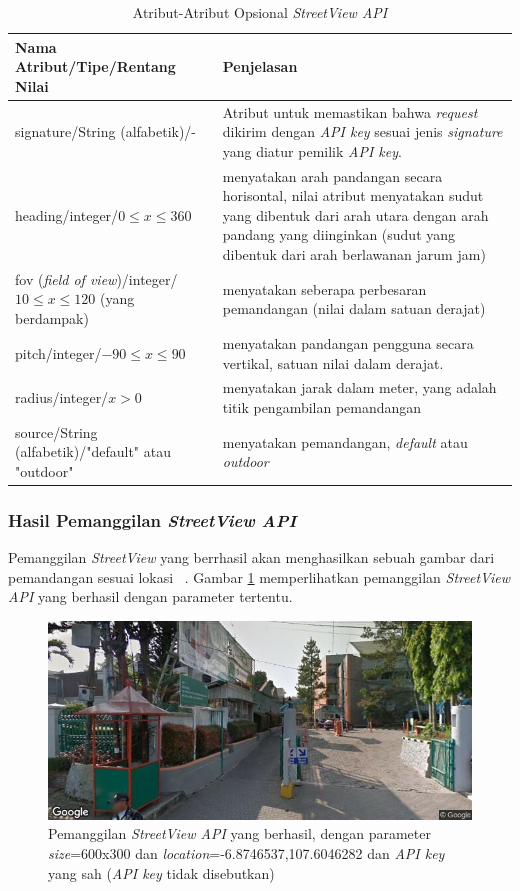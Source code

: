\begin{table}[ht!]
	\centering
	\caption{Atribut-Atribut Opsional \textit{StreetView API}}
	\label{tab:atribut-opsional-streetview-api}
\begin{tabular}{|p{7cm}|p{7cm}|}
\hline
Nama Atribut/Tipe/Rentang Nilai & Penjelasan \\ \hline \hline
signature/String (alfabetik)/- &  Atribut untuk memastikan bahwa \textit{request} dikirim dengan {\it API key} sesuai jenis \textit{signature} yang diatur pemilik {\it API key}.  \\ \hline
heading/integer/$ 0 \leq x \leq 360 $ & menyatakan arah pandangan secara horisontal, nilai atribut menyatakan sudut yang dibentuk dari arah utara dengan arah pandang yang diinginkan (sudut yang dibentuk dari arah berlawanan jarum jam) \\ \hline
fov (\textit{field of view})/integer/$ 10 \leq x \leq 120 $ (yang berdampak) & menyatakan seberapa perbesaran pemandangan (nilai dalam satuan derajat) \\ \hline
pitch/integer/$ -90 \leq  x \leq 90$ & menyatakan pandangan pengguna secara vertikal, satuan nilai dalam derajat.\\ \hline
radius/integer/$ x > 0 $ & menyatakan jarak dalam meter, yang adalah titik pengambilan pemandangan\\ \hline
source/String (alfabetik)/"default" atau "outdoor" & menyatakan pemandangan, \textit{default} atau \textit{outdoor}\\ 
\hline

\end{tabular}
\end{table}

\subsubsection{Hasil Pemanggilan \textit{StreetView API}}
Pemanggilan \textit{StreetView} yang berrhasil akan menghasilkan sebuah gambar dari pemandangan sesuai lokasi ~\cite{streetview-api}. Gambar \ref{fig:success-streetview} memperlihatkan pemanggilan \textit{StreetView API} yang berhasil dengan parameter tertentu.

\begin{figure}[h]
		\includegraphics[scale=0.8]{Gambar/streetview90.png}
	\caption{Pemanggilan \textit{StreetView API} yang berhasil, dengan parameter \textit{size}=600x300 dan \textit{location}=-6.8746537,107.6046282 dan \textit{API key} yang sah (\textit{API key} tidak disebutkan)}
	\label{fig:success-streetview}
\end{figure}

